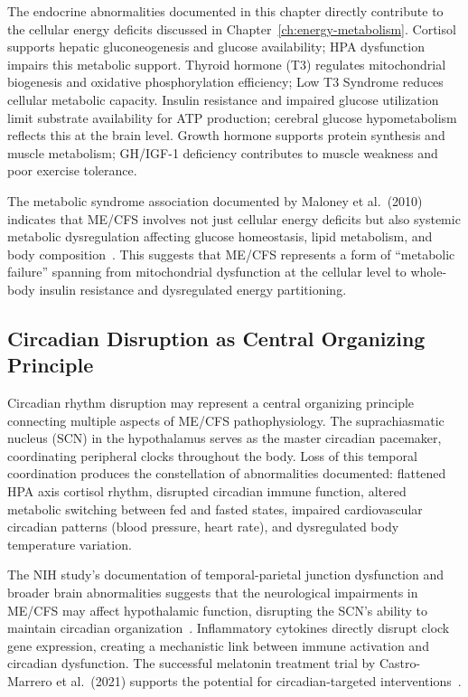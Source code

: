 The endocrine abnormalities documented in this chapter directly contribute to the cellular energy deficits discussed in Chapter~\ref{ch:energy-metabolism}. Cortisol supports hepatic gluconeogenesis and glucose availability; HPA dysfunction impairs this metabolic support. Thyroid hormone (T3) regulates mitochondrial biogenesis and oxidative phosphorylation efficiency; Low T3 Syndrome reduces cellular metabolic capacity. Insulin resistance and impaired glucose utilization limit substrate availability for ATP production; cerebral glucose hypometabolism reflects this at the brain level. Growth hormone supports protein synthesis and muscle metabolism; GH/IGF-1 deficiency contributes to muscle weakness and poor exercise tolerance.

The metabolic syndrome association documented by Maloney et al.\ (2010) indicates that ME/CFS involves not just cellular energy deficits but also systemic metabolic dysregulation affecting glucose homeostasis, lipid metabolism, and body composition~\cite{maloney2010metabolic}. This suggests that ME/CFS represents a form of ``metabolic failure'' spanning from mitochondrial dysfunction at the cellular level to whole-body insulin resistance and dysregulated energy partitioning.

\subsection{Circadian Disruption as Central Organizing Principle}

Circadian rhythm disruption may represent a central organizing principle connecting multiple aspects of ME/CFS pathophysiology. The suprachiasmatic nucleus (SCN) in the hypothalamus serves as the master circadian pacemaker, coordinating peripheral clocks throughout the body. Loss of this temporal coordination produces the constellation of abnormalities documented: flattened HPA axis cortisol rhythm, disrupted circadian immune function, altered metabolic switching between fed and fasted states, impaired cardiovascular circadian patterns (blood pressure, heart rate), and dysregulated body temperature variation.

The NIH study's documentation of temporal-parietal junction dysfunction and broader brain abnormalities suggests that the neurological impairments in ME/CFS may affect hypothalamic function, disrupting the SCN's ability to maintain circadian organization~\cite{walitt2024deep}. Inflammatory cytokines directly disrupt clock gene expression, creating a mechanistic link between immune activation and circadian dysfunction. The successful melatonin treatment trial by Castro-Marrero et al.\ (2021) supports the potential for circadian-targeted interventions~\cite{castromarrero2021melatonin}.

